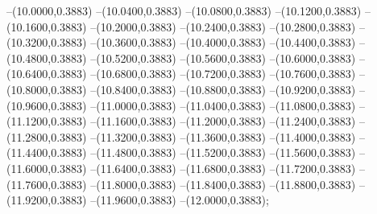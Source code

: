 {	--(10.0000,0.3883)
	--(10.0400,0.3883)
	--(10.0800,0.3883)
	--(10.1200,0.3883)
	--(10.1600,0.3883)
	--(10.2000,0.3883)
	--(10.2400,0.3883)
	--(10.2800,0.3883)
	--(10.3200,0.3883)
	--(10.3600,0.3883)
	--(10.4000,0.3883)
	--(10.4400,0.3883)
	--(10.4800,0.3883)
	--(10.5200,0.3883)
	--(10.5600,0.3883)
	--(10.6000,0.3883)
	--(10.6400,0.3883)
	--(10.6800,0.3883)
	--(10.7200,0.3883)
	--(10.7600,0.3883)
	--(10.8000,0.3883)
	--(10.8400,0.3883)
	--(10.8800,0.3883)
	--(10.9200,0.3883)
	--(10.9600,0.3883)
	--(11.0000,0.3883)
	--(11.0400,0.3883)
	--(11.0800,0.3883)
	--(11.1200,0.3883)
	--(11.1600,0.3883)
	--(11.2000,0.3883)
	--(11.2400,0.3883)
	--(11.2800,0.3883)
	--(11.3200,0.3883)
	--(11.3600,0.3883)
	--(11.4000,0.3883)
	--(11.4400,0.3883)
	--(11.4800,0.3883)
	--(11.5200,0.3883)
	--(11.5600,0.3883)
	--(11.6000,0.3883)
	--(11.6400,0.3883)
	--(11.6800,0.3883)
	--(11.7200,0.3883)
	--(11.7600,0.3883)
	--(11.8000,0.3883)
	--(11.8400,0.3883)
	--(11.8800,0.3883)
	--(11.9200,0.3883)
	--(11.9600,0.3883)
	--(12.0000,0.3883);
}
